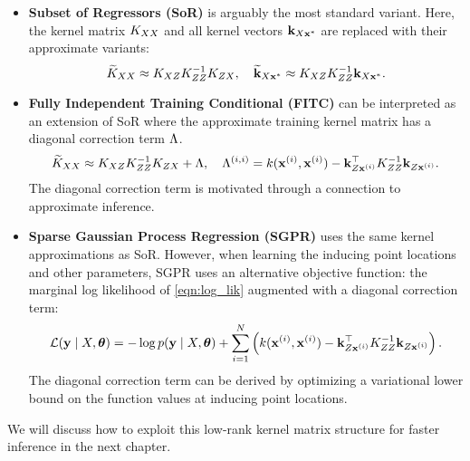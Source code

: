 \begin{itemize}
	\item {\bf Subset of Regressors (SoR)} \cite{silverman1985some,smola2001sparse} is arguably the most standard variant.
    Here, the kernel matrix $K_{XX}$ and all kernel vectors $\mathbf{k}_{X\mathbf{x}^*}$ are replaced with their approximate variants:
    \[ \widetilde {K}_{XX} \approx K_{XZ} K_{ZZ}^{-1} K_{ZX}, \quad
       \widetilde {\mathbf{k}}_{X\mathbf{x}^*} \approx K_{XZ} K_{ZZ}^{-1} \mathbf{k}_{X\mathbf{x}^*}. \]

	\item {\bf Fully Independent Training Conditional (FITC) } \cite{snelson2006sparse} can be interpreted as an extension of SoR
		where the approximate training kernel matrix has a diagonal correction term $\Lambda$.
    \[ \widetilde {K}_{XX} \approx K_{XZ} K_{ZZ}^{-1} K_{ZX} + \Lambda, \quad
       \Lambda^{(i,i)} = k(\mathbf{x}^{(i)}, \mathbf{x}^{(i)}) - \mathbf{k}_{Z\mathbf{x}^{(i)}}^\top K_{ZZ}^{-1} \mathbf{k}_{Z\mathbf{x}^{(i)}}. \]
    The diagonal correction term is motivated through a connection to approximate inference.

	\item {\bf Sparse Gaussian Process Regression (SGPR) } \cite{titsias2009variational} uses the same kernel approximations as SoR.
		However, when learning the inducing point locations and other parameters, SGPR uses an alternative objective function:
		the marginal log likelihood of \cref{eqn:log_lik} augmented with a diagonal correction term:
    \[ \mathcal L(\mathbf{y} \mid X, \boldsymbol{\theta}) = -\log p(\mathbf{y} \mid X, \boldsymbol{\theta}) + \sum_{i=1}^N \left( k(\mathbf{x}^{(i)}, \mathbf{x}^{(i)}) - \mathbf{k}_{Z\mathbf{x}^{(i)}}^\top K_{ZZ}^{-1} \mathbf{k}_{Z\mathbf{x}^{(i)}} \right). \]
    The diagonal correction term can be derived by optimizing a variational lower bound on the function values at inducing point locations.
\end{itemize}
%
We will discuss how to exploit this low-rank kernel matrix structure for faster inference in the next chapter.

